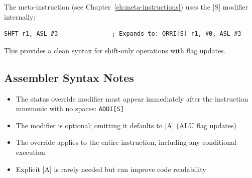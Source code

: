 The  meta-instruction (see Chapter~\ref{ch:meta-instructions}) uses the {[}S{]} modifier internally:

\begin{lstlisting}
SHFT r1, ASL #3               ; Expands to: ORRI[S] r1, #0, ASL #3
\end{lstlisting}

This provides a clean syntax for shift-only operations with flag updates.

\subsection{Assembler Syntax Notes}

\begin{itemize}
	\item The status override modifier must appear immediately after the instruction mnemonic with no spaces: \texttt{ADDI[S]}
	\item The modifier is optional; omitting it defaults to {[}A{]} (ALU flag updates)
	\item The override applies to the entire instruction, including any conditional execution
	\item Explicit {[}A{]} is rarely needed but can improve code readability
\end{itemize}
